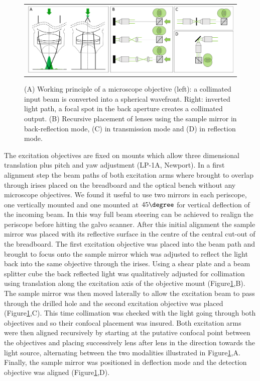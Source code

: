 \documentclass[12pt]{spieman}  %
\begin{document}
\begin{figure}
   \begin{center}
   \begin{tabular}{c}
   \includegraphics[width=\textwidth]{Panel4.eps}
   \end{tabular}
   \end{center}
   \caption{\label{fig:alignment2} (A) Working principle of a microscope objective (left): a collimated input beam is converted into a spherical wavefront. Right: inverted light path, a focal spot in the back aperture creates a collimated output. (B) Recursive placement of lenses using the sample mirror in back-reflection mode, (C) in transmission mode and (D) in reflection mode.} 
   \end{figure}

The excitation objectives are fixed on mounts which allow three dimensional translation plus pitch and yaw adjustment (LP-1A, Newport). In a first alignment step the beam paths of both excitation arms where brought to overlap through irises placed on the breadboard and the optical bench without any microscope objectives. We found it useful to use two mirrors in each periscope, one vertically mounted and one mounted at $45\degree$ for vertical deflection of the incoming beam. In this way full beam steering can be achieved to realign the periscope before hitting the galvo scanner. After this initial alignment the sample mirror was placed with its reflective surface in the centre of the central cut-out of the breadboard. The first excitation objective was placed into the beam path and brought to focus onto the sample mirror which was adjusted to reflect the light back into the same objective through the irises. Using a shear plate and a beam splitter cube the back reflected light was qualitatively adjusted for collimation using translation along the excitation axis of the objective mount (Figure\ref{fig:alignment2},B). The sample mirror was then moved laterally to allow the excitation beam to pass through the drilled hole and the second excitation objective was placed (Figure\ref{fig:alignment2},C). This time collimation was checked with the light going through both objectives and so their confocal placement was insured. Both excitation arms were then aligned recursively by starting at the putative confocal point between the objectives and placing successively lens after lens in the direction towards the light source, alternating between the two modalities illustrated in Figure\ref{fig:alignment2},A. Finally, the sample mirror was positioned in deflection mode and the detection objective was aligned (Figure\ref{fig:alignment2},D). 


\end{document}
